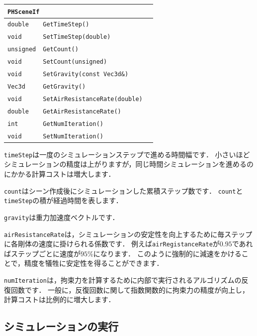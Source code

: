 \begin{center}
\begin{tabular}{p{.15\hsize}p{.55\hsize}p{.2\hsize}}
\multicolumn{3}{l}{\texttt{PHSceneIf}}							  \\ \midrule
\texttt{double}		& \texttt{GetTimeStep()}					& \\
\texttt{void}		& \texttt{SetTimeStep(double)}				& \\
\texttt{unsigned}	& \texttt{GetCount()}						& \\
\texttt{void}		& \texttt{SetCount(unsigned)}				& \\
\texttt{void}		& \texttt{SetGravity(const Vec3d\&)}		& \\
\texttt{Vec3d}		& \texttt{GetGravity()}						& \\
\texttt{void}		& \texttt{SetAirResistanceRate(double)}		& \\
\texttt{double}		& \texttt{GetAirResistanceRate()}			& \\
\texttt{int}		& \texttt{GetNumIteration()}				& \\
\texttt{void}		& \texttt{SetNumIteration()}				& \\
\end{tabular}
\end{center}

\texttt{timeStep}は一度のシミュレーションステップで進める時間幅です．
\KLUDGE 小さいほどシミュレーションの精度は上がりますが，同じ時間シミュレーションを進めるのにかかる計算コストは増大します．

\texttt{count}はシーン作成後にシミュレーションした累積ステップ数です．
\texttt{count}と\texttt{timeStep}の積が経過時間を表します．

\texttt{gravity}は重力加速度ベクトルです．

\texttt{airResistanceRate}は，シミュレーションの安定性を向上するために毎ステップに各剛体の速度に掛けられる係数です．
\KLUDGE 例えば\texttt{airRegistanceRate}が$0.95$であればステップごとに速度が$95$\%になります．
\KLUDGE このように強制的に減速をかけることで，精度を犠牲に安定性を得ることができます．

\texttt{numIteration}は，拘束力を計算するために内部で実行されるアルゴリズムの反復回数です．
\KLUDGE 一般に，反復回数に関して指数関数的に拘束力の精度が向上し，計算コストは比例的に増大します．

\subsection*{シミュレーションの実行}

